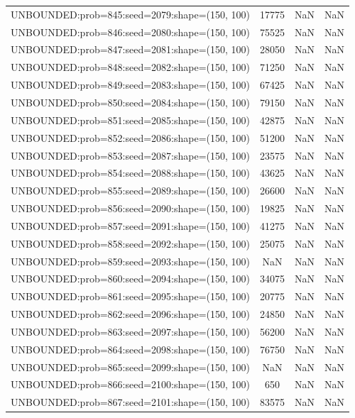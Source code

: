 \begin{longtable}{lccc}
UNBOUNDED:prob=845:seed=2079:shape=(150, 100) & 17775 &   NaN &    NaN \\
UNBOUNDED:prob=846:seed=2080:shape=(150, 100) & 75525 &   NaN &    NaN \\
UNBOUNDED:prob=847:seed=2081:shape=(150, 100) & 28050 &   NaN &    NaN \\
UNBOUNDED:prob=848:seed=2082:shape=(150, 100) & 71250 &   NaN &    NaN \\
UNBOUNDED:prob=849:seed=2083:shape=(150, 100) & 67425 &   NaN &    NaN \\
UNBOUNDED:prob=850:seed=2084:shape=(150, 100) & 79150 &   NaN &    NaN \\
UNBOUNDED:prob=851:seed=2085:shape=(150, 100) & 42875 &   NaN &    NaN \\
UNBOUNDED:prob=852:seed=2086:shape=(150, 100) & 51200 &   NaN &    NaN \\
UNBOUNDED:prob=853:seed=2087:shape=(150, 100) & 23575 &   NaN &    NaN \\
UNBOUNDED:prob=854:seed=2088:shape=(150, 100) & 43625 &   NaN &    NaN \\
UNBOUNDED:prob=855:seed=2089:shape=(150, 100) & 26600 &   NaN &    NaN \\
UNBOUNDED:prob=856:seed=2090:shape=(150, 100) & 19825 &   NaN &    NaN \\
UNBOUNDED:prob=857:seed=2091:shape=(150, 100) & 41275 &   NaN &    NaN \\
UNBOUNDED:prob=858:seed=2092:shape=(150, 100) & 25075 &   NaN &    NaN \\
UNBOUNDED:prob=859:seed=2093:shape=(150, 100) &   NaN &   NaN &    NaN \\
UNBOUNDED:prob=860:seed=2094:shape=(150, 100) & 34075 &   NaN &    NaN \\
UNBOUNDED:prob=861:seed=2095:shape=(150, 100) & 20775 &   NaN &    NaN \\
UNBOUNDED:prob=862:seed=2096:shape=(150, 100) & 24850 &   NaN &    NaN \\
UNBOUNDED:prob=863:seed=2097:shape=(150, 100) & 56200 &   NaN &    NaN \\
UNBOUNDED:prob=864:seed=2098:shape=(150, 100) & 76750 &   NaN &    NaN \\
UNBOUNDED:prob=865:seed=2099:shape=(150, 100) &   NaN &   NaN &    NaN \\
UNBOUNDED:prob=866:seed=2100:shape=(150, 100) &   650 &   NaN &    NaN \\
UNBOUNDED:prob=867:seed=2101:shape=(150, 100) & 83575 &   NaN &    NaN \\

\end{longtable}
